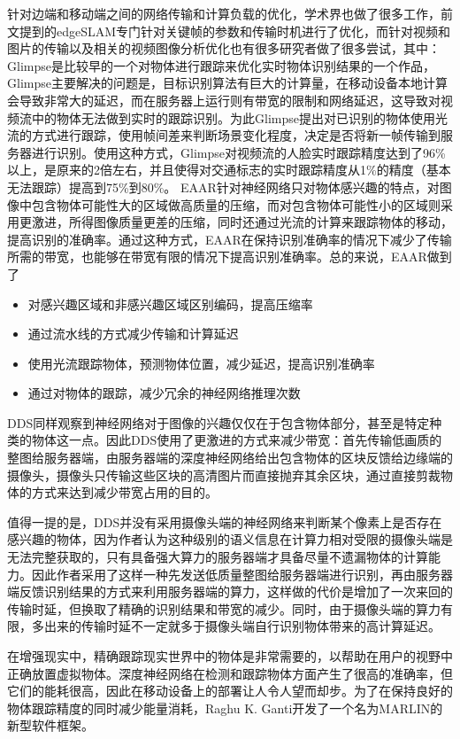 针对边端和移动端之间的网络传输和计算负载的优化，学术界也做了很多工作，前文提到的edgeSLAM专门针对关键帧的参数和传输时机进行了优化，而针对视频和图片的传输以及相关的视频图像分析优化也有很多研究者做了很多尝试，其中：
Glimpse\cite{CheRavDen15}是比较早的一个对物体进行跟踪来优化实时物体识别结果的一个作品，Glimpse主要解决的问题是，目标识别算法有巨大的计算量，在移动设备本地计算会导致非常大的延迟，而在服务器上运行则有带宽的限制和网络延迟，这导致对视频流中的物体无法做到实时的跟踪识别。为此Glimpse提出对已识别的物体使用光流的方式进行跟踪，使用帧间差来判断场景变化程度，决定是否将新一帧传输到服务器进行识别。使用这种方式，Glimpse对视频流的人脸实时跟踪精度达到了96\%以上，是原来的2倍左右，并且使得对交通标志的实时跟踪精度从1\%的精度（基本无法跟踪）提高到75\%到80\%。
EAAR\cite{DuPerYua20}针对神经网络只对物体感兴趣的特点，对图像中包含物体可能性大的区域做高质量的压缩，而对包含物体可能性小的区域则采用更激进，所得图像质量更差的压缩，同时还通过光流的计算来跟踪物体的移动，提高识别的准确率。通过这种方式，EAAR在保持识别准确率的情况下减少了传输所需的带宽，也能够在带宽有限的情况下提高识别准确率。总的来说，EAAR做到了
\begin{itemize}
  \item 对感兴趣区域和非感兴趣区域区别编码，提高压缩率
  \item 通过流水线的方式减少传输和计算延迟
  \item 使用光流跟踪物体，预测物体位置，减少延迟，提高识别准确率
  \item 通过对物体的跟踪，减少冗余的神经网络推理次数
\end{itemize}

DDS\cite{liu2019edge}同样观察到神经网络对于图像的兴趣仅仅在于包含物体部分，甚至是特定种类的物体这一点。因此DDS使用了更激进的方式来减少带宽：首先传输低画质的整图给服务器端，由服务器端的深度神经网络给出包含物体的区块反馈给边缘端的摄像头，摄像头只传输这些区块的高清图片而直接抛弃其余区块，通过直接剪裁物体的方式来达到减少带宽占用的目的。

值得一提的是，DDS并没有采用摄像头端的神经网络来判断某个像素上是否存在感兴趣的物体，因为作者认为这种级别的语义信息在计算力相对受限的摄像头端是无法完整获取的，只有具备强大算力的服务器端才具备尽量不遗漏物体的计算能力。因此作者采用了这样一种先发送低质量整图给服务器端进行识别，再由服务器端反馈识别结果的方式来利用服务器端的算力，这样做的代价是增加了一次来回的传输时延，但换取了精确的识别结果和带宽的减少。同时，由于摄像头端的算力有限，多出来的传输时延不一定就多于摄像头端自行识别物体带来的高计算延迟。

在增强现实中，精确跟踪现实世界中的物体是非常需要的，以帮助在用户的视野中正确放置虚拟物体。深度神经网络在检测和跟踪物体方面产生了很高的准确率，但它们的能耗很高，因此在移动设备上的部署让人令人望而却步。为了在保持良好的物体跟踪精度的同时减少能量消耗，Raghu K. Ganti开发了一个名为MARLIN\cite{ApiRanChe19}的新型软件框架。

